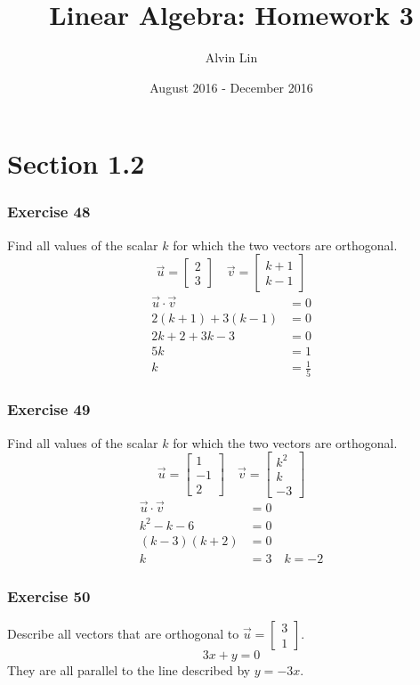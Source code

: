 \documentclass[letterpaper, 12pt]{math}
\title{Linear Algebra: Homework 3}
\author{Alvin Lin}
\date{August 2016 - December 2016}
\begin{document}
\maketitle

\section*{Section 1.2}

\subsubsection*{Exercise 48}
Find all values of the scalar \( k \) for which the two vectors are orthogonal.
\[ \vec{u} = \begin{bmatrix}2 \\ 3\end{bmatrix} \quad
  \vec{v} = \begin{bmatrix}k+1 \\ k-1\end{bmatrix} \]
\begin{align*}
  \vec{u}\cdot\vec{v} &= 0 \\
  2(k+1)+3(k-1) &= 0 \\
  2k+2+3k-3 &= 0 \\
  5k &= 1 \\
  k &= \frac{1}{5}
\end{align*}

\subsubsection*{Exercise 49}
Find all values of the scalar \( k \) for which the two vectors are orthogonal.
\[ \vec{u} = \begin{bmatrix}1 \\ -1 \\ 2\end{bmatrix} \quad
  \vec{v} = \begin{bmatrix}k^2 \\ k \\ -3\end{bmatrix} \]
\begin{align*}
  \vec{u}\cdot\vec{v} &= 0 \\
  k^2-k-6 &= 0 \\
  (k-3)(k+2) &= 0 \\
  k &= 3 \quad k = -2
\end{align*}

\subsubsection*{Exercise 50}
Describe all vectors that are orthogonal to \( \vec{u} = \begin{bmatrix}3 \\ 1
\end{bmatrix} \).
\[ 3x+y = 0 \]
They are all parallel to the line described by \( y = -3x \).
\end{document}

